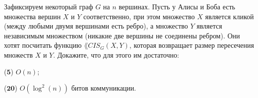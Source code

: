 Зафиксируем некоторый граф $G$ на $n$ вершинах. Пусть у Алисы и Боба есть множества вершин $X$ и  $Y$ соответственно, при
этом множество $X$ является кликой (между любыми двумя вершинами есть ребро), а множество $Y$ является независимым множеством
(никакие две вершины не соединены ребром). Они хотят посчитать функцию $\lang{CIS}_G(X, Y)$, которая возвращает размер
пересечения множеств $X$ и $Y$. Докажите, что для этого им достаточно:
\begin{enumcyr}
    \item ($\mathbf{5}$) $O(n)$; 
    \item ($\mathbf{20}$) $O(\log^2(n))$ битов коммуникации. 
\end{enumcyr}